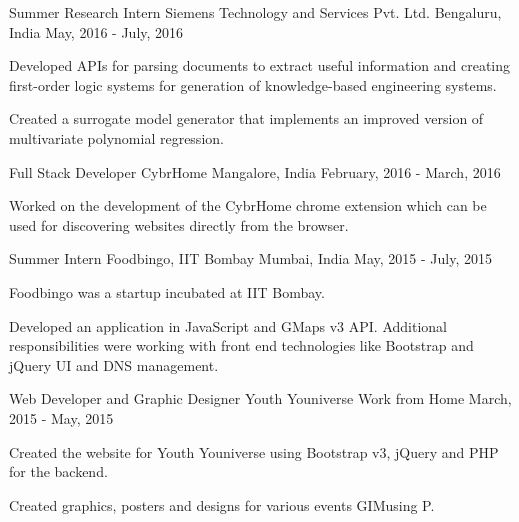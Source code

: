 \begin{cventries}
  \cventry
    {Summer Research Intern}
    {Siemens Technology and Services Pvt. Ltd.}
    {Bengaluru, India}
    {May, 2016 - July, 2016}
    {
      \begin{cvitems}
        \item {Developed APIs for parsing documents to extract useful information and creating first-order logic systems for generation of knowledge-based engineering systems.}
        \item {Created a surrogate model generator that implements an improved version of multivariate polynomial regression.}
      \end{cvitems}
    }
  \cventry
    {Full Stack Developer}
    {CybrHome}
    {Mangalore, India}
    {February, 2016 - March, 2016}
    {
      \begin{cvitems}
        \item {Worked on the development of the CybrHome chrome extension which can be used for discovering websites directly from the browser.}
      \end{cvitems}
    }
  \cventry
    {Summer Intern}
    {Foodbingo, IIT Bombay}
    {Mumbai, India}
    {May, 2015 - July, 2015}
    {
      \begin{cvitems}
        \item {Foodbingo was a startup incubated at IIT Bombay.}
        \item {Developed an application in JavaScript and GMaps v3 API. Additional responsibilities were working with front end technologies like Bootstrap and jQuery UI and DNS management.}
      \end{cvitems}
    }
  \cventry
    {Web Developer and Graphic Designer}
    {Youth Youniverse}
    {Work from Home}
    {March, 2015 - May, 2015}
    {
      \begin{cvitems}
        \item {Created the website for Youth Youniverse using Bootstrap v3, jQuery and PHP for the backend.}
        \item {Created graphics, posters and designs for various events GIMusing P.}
      \end{cvitems}
    }
\end{cventries}
